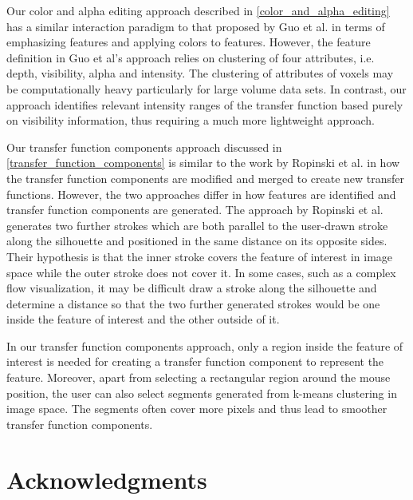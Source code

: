 \documentclass[twoside,twocolumn,10pt]{article}
\begin{document}

Our color and alpha editing approach described in \autoref{color_and_alpha_editing} has a similar interaction paradigm to that proposed by Guo et al. \cite{guo_wysiwyg_2011} in terms of emphasizing features and applying colors to features. However, the feature definition in Guo et al's approach relies on clustering of four attributes, i.e. depth, visibility, alpha and intensity. The clustering of attributes of voxels may be computationally heavy particularly for large volume data sets.
In contrast, our approach identifies relevant intensity ranges of the transfer function based purely on visibility information, thus requiring a much more lightweight approach.

Our transfer function components approach discussed in \autoref{transfer_function_components} is similar to the work by Ropinski et al. \cite{ropinski_stroke-based_2008} in how the transfer function components are modified and merged to create new transfer functions.
However, the two approaches differ in how features are identified and transfer function components are generated.
The approach by Ropinski et al. generates two further strokes which are both parallel to the user-drawn stroke along the silhouette and positioned in the same distance on its opposite sides. 
Their hypothesis is that the inner stroke covers the feature of interest in image space while the outer stroke does not cover it.
In some cases, such as a complex flow visualization, it may be difficult draw a stroke along the silhouette and determine a distance so that the two further generated strokes would be one inside the feature of interest and the other outside of it.

In our transfer function components approach, only a region inside the feature of interest is needed for creating a transfer function component to represent the feature. Moreover, apart from selecting a rectangular region around the mouse position, the user can also select segments generated from k-means clustering in image space. The segments often cover more pixels and thus lead to smoother transfer function components.


\section{Acknowledgments}
\end{document}
